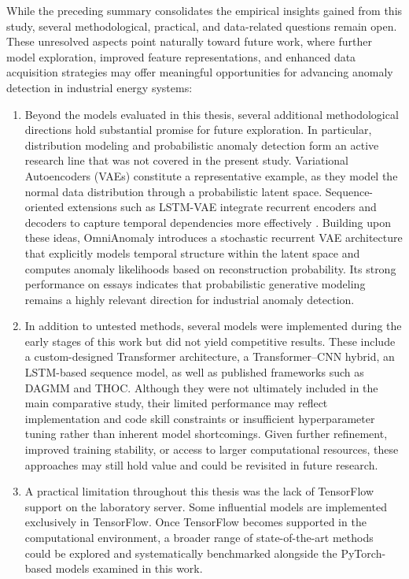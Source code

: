 While the preceding summary consolidates the empirical insights gained from this study, several methodological, practical, and data-related questions remain open. These unresolved aspects point naturally toward future work, where further model exploration, improved feature representations, and enhanced data acquisition strategies may offer meaningful opportunities for advancing anomaly detection in industrial energy systems:
\begin{enumerate}

    \item Beyond the models evaluated in this thesis, several additional methodological directions hold substantial promise for future exploration. In particular, distribution modeling and probabilistic anomaly detection form an active research line that was not covered in the present study. Variational Autoencoders (VAEs) constitute a representative example, as they model the normal data distribution through a probabilistic latent space. Sequence-oriented extensions such as LSTM-VAE integrate recurrent encoders and decoders to capture temporal dependencies more effectively \cite{park2018lstmvae}. Building upon these ideas, OmniAnomaly \cite{Su2019RobustAD} introduces a stochastic recurrent VAE architecture that explicitly models temporal structure within the latent space and computes anomaly likelihoods based on reconstruction probability. Its strong performance on essays indicates that probabilistic generative modeling remains a highly relevant direction for industrial anomaly detection.

    \item In addition to untested methods, several models were implemented during the early stages of this work but did not yield competitive results. These include a custom-designed Transformer architecture, a Transformer–CNN hybrid, an LSTM-based sequence model, as well as published frameworks such as DAGMM and THOC. Although they were not ultimately included in the main comparative study, their limited performance may reflect implementation and code skill constraints or insufficient hyperparameter tuning rather than inherent model shortcomings. Given further refinement, improved training stability, or access to larger computational resources, these approaches may still hold value and could be revisited in future research.

    \item A practical limitation throughout this thesis was the lack of TensorFlow support on the laboratory server. Some influential models are implemented exclusively in TensorFlow. Once TensorFlow becomes supported in the computational environment, a broader range of state-of-the-art methods could be explored and systematically benchmarked alongside the PyTorch-based models examined in this work.


\end{enumerate}
